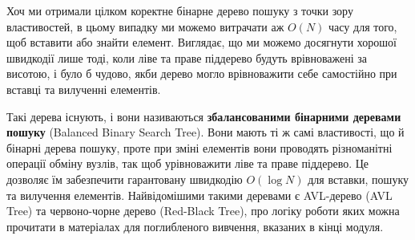 \documentclass[12pt,a4paper]{report}
\begin{document}
Хоч ми отримали цілком коректне бінарне дерево пошуку з точки зору властивостей, в цьому випадку ми можемо витрачати аж \(O(N)\) часу для того, щоб вставити або знайти елемент. Виглядає, що ми можемо досягнути хорошої швидкодії лише тоді, коли ліве та праве піддерево будуть врівноважені за висотою, і було б чудово, якби дерево могло врівноважити себе самостійно при вставці та вилученні елементів.

\begin{center}
\end{center}

Такі дерева існують, і вони називаються \textbf{збалансованими бінарними деревами пошуку} (Balanced Binary Search Tree). Вони мають ті ж самі властивості, що й бінарні дерева пошуку, проте при зміні елементів вони проводять різноманітні операції обміну вузлів, так щоб урівноважити ліве та праве піддерево. Це дозволяє їм забезпечити гарантовану швидкодію \(O(\log N)\) для вставки, пошуку та вилучення елементів. Найвідомішими такими деревами є AVL-дерево (AVL Tree) та червоно-чорне дерево (Red-Black Tree), про логіку роботи яких можна прочитати в матеріалах для поглибленого вивчення, вказаних в кінці модуля. 
\end{document}
